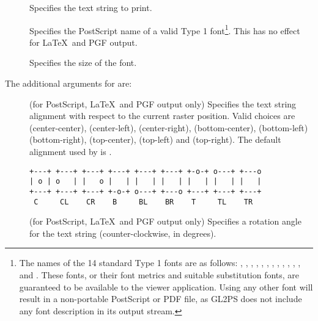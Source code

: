 \begin{description}
\item[] Specifies the text string to print.
\item[] Specifies the PostScript name of a valid Type 1
  font\footnote{The names of the 14 standard Type 1 fonts are as
    follows: , , ,
    , , ,
    , , ,
    , , ,
     and .  These fonts, or their font
    metrics and suitable substitution fonts, are guaranteed to be
    available to the viewer application. Using any other font will
    result in a non-portable PostScript or PDF file, as GL2PS does not
    include any font description in its output stream.}.  This has no
  effect for \LaTeX\ and PGF output.
\item[] Specifies the size of the font.
\end{description}

The additional arguments for  are:

\begin{description}
\item[] (for PostScript, \LaTeX\ and PGF output only)
  Specifies the text string alignment with respect to the current
  raster position. Valid choices are 
  (center-center),  (center-left),
   (center-right), 
  (bottom-center),  (bottom-left) 
  (bottom-right),  (top-center), 
  (top-left) and  (top-right). The default alignment
  used by  is .

\begin{verbatim}
+---+ +---+ +---+ +---+ +---+ +---+ +-o-+ o---+ +---o
| o | o   | |   o |   | |   | |   | |   | |   | |   |
+---+ +---+ +---+ +-o-+ o---+ +---o +---+ +---+ +---+
 C     CL    CR    B     BL    BR    T     TL    TR
\end{verbatim}

\item[] (for PostScript, \LaTeX\ and PGF output only)
  Specifies a rotation angle for the text string (counter-clockwise,
  in degrees).
\end{description}

